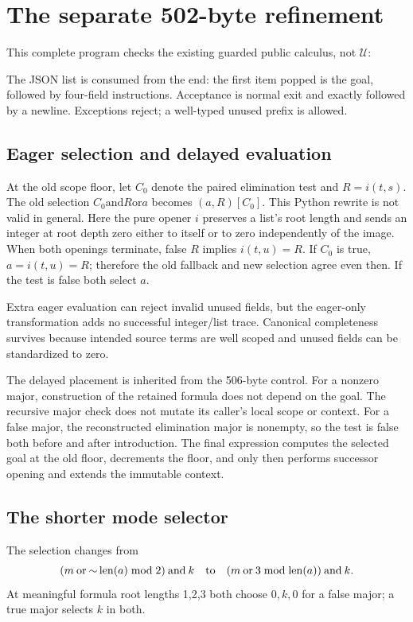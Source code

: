\section{The separate 502-byte refinement}
This complete program checks the existing guarded public calculus,
not $\mathcal U$:

The JSON list is consumed from the end: the first item popped is the
goal, followed by four-field instructions. Acceptance is normal exit
and exactly  followed by a newline. Exceptions reject;
a well-typed unused prefix is allowed.

\subsection{Eager selection and delayed evaluation}
At the old scope floor, let $C_0$ denote the paired elimination test and
$R=i(t,s)$. The old selection
$C_0\mathbin{\mathrm{and}}R\mathbin{\mathrm{or}}a$ becomes $(a,R)[C_0]$.
This Python rewrite is not valid in general. Here the pure opener $i$
preserves a list's root length and sends an integer at root depth zero
either to itself or to zero independently of the image.
When both openings terminate, false $R$ implies $i(t,u)=R$.
If $C_0$ is true, $a=i(t,u)=R$; therefore the old fallback and new
selection agree even then. If the test is false both select $a$.

Extra eager evaluation can reject invalid unused fields, but the
eager-only transformation adds no successful integer/list trace.
Canonical completeness survives because intended source terms are well
scoped and unused fields can be standardized to zero.

The delayed placement is inherited from the 506-byte control.
For a nonzero major, construction of the retained formula does not
depend on the goal. The recursive major check does not mutate its
caller's local scope or context. For a false major, the reconstructed
elimination major is nonempty, so the test is false both before and
after introduction. The final expression computes the selected goal at
the old floor, decrements the floor, and only then performs successor
opening and extends the immutable context.

\subsection{The shorter mode selector}
The selection changes from
\[
 (m\mathbin{\mathrm{or}}\mathord{\sim}\operatorname{len}(a)\bmod2)
   \mathbin{\mathrm{and}}k
 \quad\hbox{to}\quad
 (m\mathbin{\mathrm{or}}3\bmod\operatorname{len}(a))
   \mathbin{\mathrm{and}}k.
\]
At meaningful formula root lengths 1,2,3 both choose $0,k,0$ for a
false major; a true major selects $k$ in both.

